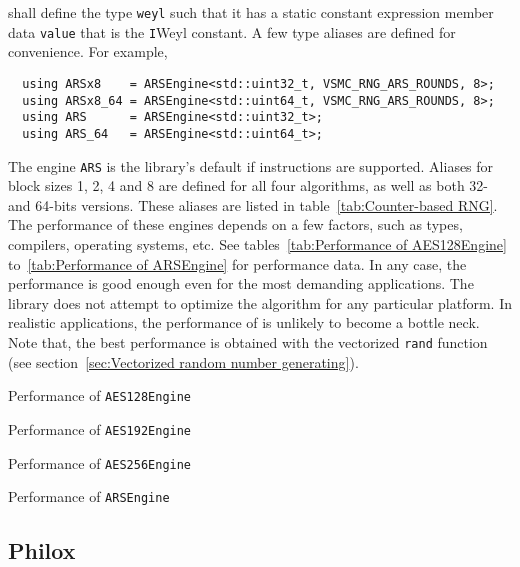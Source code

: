 shall define the type \verb|weyl| such that it has a static constant expression
member data \verb|value| that is the \verb|I|\ith Weyl constant. A few type
aliases are defined for convenience. For example,
\begin{Verbatim}
  using ARSx8    = ARSEngine<std::uint32_t, VSMC_RNG_ARS_ROUNDS, 8>;
  using ARSx8_64 = ARSEngine<std::uint64_t, VSMC_RNG_ARS_ROUNDS, 8>;
  using ARS      = ARSEngine<std::uint32_t>;
  using ARS_64   = ARSEngine<std::uint64_t>;
\end{Verbatim}
The engine \verb|ARS| is the library's default \rng if \aesni instructions are
supported. Aliases for block sizes 1, 2, 4 and 8 are defined for all four
algorithms, as well as both 32- and 64-bits versions. These aliases are listed
in table~\ref{tab:Counter-based RNG}. The performance of these engines depends
on a few factors, such as \cpu types, compilers, operating systems, etc. See
tables~\ref{tab:Performance of AES128Engine} to~\ref{tab:Performance of
  ARSEngine} for performance data. In any case, the performance is good enough
even for the most demanding applications. The library does not attempt to
optimize the algorithm for any particular platform. In realistic applications,
the performance of \rng is unlikely to become a bottle neck. Note that, the
best performance is obtained with the vectorized \verb|rand| function (see
section~\ref{sec:Vectorized random number generating}).

\begin{table}
  \caption{Performance of \protect\texttt{AES128Engine}}
  \label{tab:Performance of AES128Engine}
\end{table}

\begin{table}
  \caption{Performance of \protect\texttt{AES192Engine}}
  \label{tab:Performance of AES192Engine}
\end{table}

\begin{table}
  \caption{Performance of \protect\texttt{AES256Engine}}
  \label{tab:Performance of AES256Engine}
\end{table}

\begin{table}
  \caption{Performance of \protect\texttt{ARSEngine}}
  \label{tab:Performance of ARSEngine}
\end{table}

\subsection{Philox}
\label{sub:Philox}

